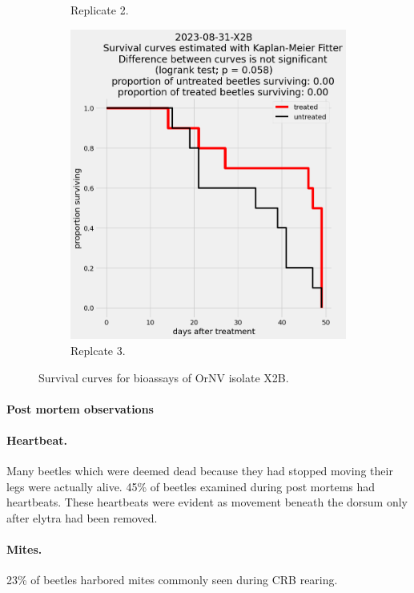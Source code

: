 \documentclass[12pt,letterpaper,english,bibliography=totocnumbered, abstract=on]{scrartcl}
\begin{document}
\begin{figure}[h]
\begin{subfigure}{.3\textwidth}
		\caption{Replicate 2.}
	\end{subfigure}
	\begin{subfigure}{.3\textwidth}
		\includegraphics[width=\textwidth]{images/survival_curves/2023-08-31-X2B}
		\caption{Replcate 3.}
	\end{subfigure}
	\caption{Survival curves for bioassays of OrNV isolate X2B.}
	\label{fig:X2B survival curves}
\end{figure}

\clearpage
\paragraph{Post mortem observations}

\paragraph{Heartbeat.} Many beetles which were deemed dead because they had stopped moving their legs were actually alive. 45\% of beetles examined during post mortems had heartbeats. These heartbeats were evident as movement beneath the dorsum only after elytra had been removed.  

\paragraph{Mites.} 23\% of beetles harbored mites commonly seen during CRB rearing.
\end{document}
